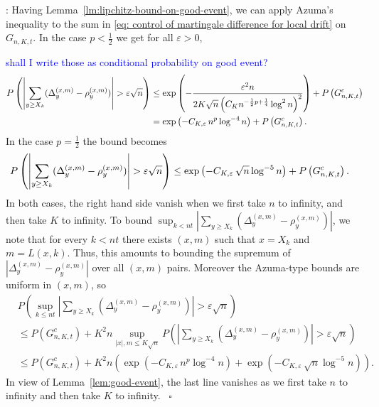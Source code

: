 \documentclass[twoside,12pt,a4paper]{article}
\numberwithin{equation}{section}
\newenvironment{proof}[1][Proof]{{\sc #1}:}{~\hfill $\square$}
\newcommand{\comment}[1]{\textcolor{blue}{#1}}
\begin{document}
\begin{proof}[Proof of Proposition~\ref{lm: approx local drift by conditional means}]
Having Lemma~\ref{lm:lipchitz-bound-on-good-event}, we can apply Azuma's inequality to the sum in \eqref{eq: control of martingale difference for local drift} on $G_{n, K, t}$. In the case $p < \frac{1}{2}$ we get for all $\varepsilon>0$,

\comment{ shall I write those as conditional probability on good event?}
\begin{align}
	P\left( \left| \sum_{y\ge X_k} (\Delta_y^{(x,m)} - \rho_y^{(x,m)})  \right| > \varepsilon \sqrt{n}  \right) \notag
	&\le \exp\left( - \frac{\varepsilon^2 n}{2 K \sqrt{n} \left( C_{K} n^{-\frac{1}{2}p + \frac{1}{4}} \log^2 n  \right)^2 } \right) + P\left(  G_{n, K, t}^c   \right) \notag \\
	&= \exp\left( - C_{K, \varepsilon} \, n^{p } \log^{-4} n \right) +
	P\left(  G_{n, K, t}^c   \right) 
   \label{eqn:azuma-drift-martingale}
.\end{align}
In the case $p = \frac{1}{2}$ the bound becomes
\begin{align}
	P\left( \left| \sum_{y \ge X_k} (\Delta_y^{(x,m)} - \rho_y^{(x,m)}) \right|  > \varepsilon \sqrt{n}  \right) \notag
	&\le  \exp\left( - C_{K, \varepsilon} \, \sqrt{n}  \log^{-5} n \right) + 
	P\left(  G_{n, K, t}^c   \right) 
.\end{align}
In both cases, the right hand side vanish when we first take $n $ to infinity, and then take $K$ to infinity. To bound $\sup_{k < nt} \left| \sum_{y \ge X_k} (\Delta_y^{(x,m)} - \rho_y^{(x,m)}) \right|$, we note that for every $k < nt$ there exists $(x,m)$ such that $x = X_k$ and $m = L(x,k)$. Thus, this amounts to bounding the supremum of $\left| \Delta_y^{(x,m)} - \rho_y^{(x,m)} \right| $ over all $(x,m)$ pairs. Moreover the Azuma-type bounds are uniform in $(x,m)$, so 
\begin{align*}
	& P\left( \sup _{k \le nt} \left| \sum_{y \ge X_k} \left(\Delta_y^{(x,m)} - \rho_y^{(x,m)}\right) \right|  > \varepsilon \sqrt{n}  \right) \\
	&\le P(G_{n, K, t}^c) + K^2 n \sup _{|x|, m \le  K \sqrt{n} }
	P\left( \left| \sum_{y \ge X_k} (\Delta_y^{(x,m)} - \rho_y^{(x,m)}) \right|  > \varepsilon \sqrt{n} \right) \\
	&\le P(G_{n, K, t}^c) + K^2 n \left( \exp\left( - C_{K, \varepsilon} \, n^{p } \log^{-4} n \right) + \exp\left( - C_{K, \varepsilon} \, \sqrt{n}  \log^{-5} n \right) \right) 
.\end{align*}
In view of Lemma~\ref{lem:good-event}, the last line vanishes as we first take $n$ to infinity and then take $K$ to infinity.
\end{proof}
\end{document}
